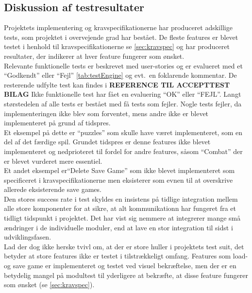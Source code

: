 \subsection{Diskussion af testresultater}
Projektets implementering og kravspecifikationerne har produceret adskillige tests, som 
projektet i overvejende grad har bestået. De fleste features er blevet
testet i henhold til kravspecifikationerne se \autoref{sec:kravspec} og har produceret 
resultater, der indikerer at hver feature fungerer som ønsket. \\

\noindent Relevante funktionelle tests er beskrevet med user-stories og er evalueret med et ``Godkendt''
eller ``Fejl'' \autoref{tab:testEngine} og evt.\ en foklarende kommentar. De resterende udfylte test kan findes i \textbf{REFERENCE TIL ACCEPTTEST BILAG}
Ikke funktionelle 
test har fået en evaluering ``OK'' eller ``FEJL''.
Langt størstedelen af alle tests er bestået med få tests som fejler. 
Nogle tests fejler, da implementeringen ikke blev som forventet, mens andre ikke er blevet 
implementeret på grund af tidspres. \\

\noindent Et eksempel på dette er ``puzzles'' som skulle have været implementeret, som en del af det færdige spil.
Grundet tidspres er denne features ikke blevet implementeret og
nedprioteret til fordel for andre features, såsom ``Combat'' der er blevet vurderet mere essentiel.\\

\noindent Et andet eksempel er``Delete Save Game'' som ikke blevet implementeret som specificeret i kravspecifikationerne men
eksisterer som evnen til at overskrive allerede eksisterende save games.\\
Den stores success rate i test skyldes en insistens på tidlige integration mellem alle store komponenter for at sikre, at 
alt kommunikationn har fungeret fra et tidligt 
tidspunkt i projektet. Det har vist sig nemmere at integrerer mange små ændringer i de individuelle moduler, end at lave en stor integration til sidst i udviklingsfasen.\\

\noindent Lad der dog ikke herske tvivl om, at der er store huller i projektets test suit, det
betyder at store features ikke er testet i tilstrækkeligt omfang. Features som load- og save game er implementeret og testet ved visuel bekræftelse, men der er en betydelig mangel på modultest til yderligere at bekræfte, at disse feature fungerer som ønsket (se \autoref{sec:kravspec}). \\
